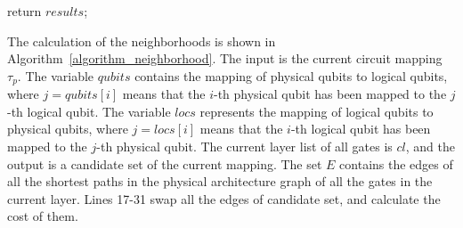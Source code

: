 \documentclass[journal]{IEEEtran}
\begin{document}
\begin{algorithm} [htbp]
          return $results$;
          
	\label{algorithm_neighborhood}
	\end{algorithm}

The calculation of the neighborhoods is shown in Algorithm~\ref{algorithm_neighborhood}. The input is the current circuit mapping $\tau_{p}$. The variable $qubits$ contains the mapping of physical qubits to logical qubits, where $ j = qubits [i] $ means that the $i$-th physical qubit has been mapped to the $j$-th logical qubit. The variable $ locs $ represents the mapping of logical qubits to physical qubits, where $ j = locs [i] $ means that the $i$-th logical qubit has been mapped to the $j$-th physical qubit.
The current layer list of all gates is $cl$, and the output is a candidate set of the current mapping. The set $E$ contains the edges of all the shortest paths in the physical architecture graph of all the gates in the current layer. Lines 17-31 swap all the edges of candidate set, and calculate the cost of them.
\end{document}
